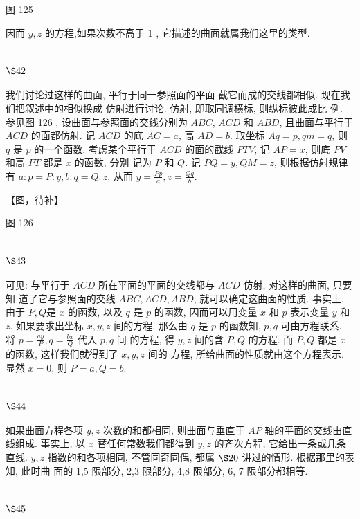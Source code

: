 图 125

因而 $y, z$ 的方程,如果次数不高于 1 , 它描述的曲面就属我们这里的类型.

\section{$\S 42$}

我们讨论过这样的曲面, 平行于同一参照面的平面 截它而成的交线都相似. 现在我们把叙述中的相似换成 仿射进行讨论. 仿射, 即取同调横标, 则纵标彼此成比 例. 参见图 126 , 设曲面与参照面的交线分别为 $A B C$, $A C D$ 和 $A B D$, 且曲面与平行于 $A C D$ 的面都仿射. 记 $A C D$ 的底 $A C=a$, 高 $A D=b$. 取坐标 $A q=p, q m=q$, 则 $q$ 是 $p$ 的一个函数. 考虑某个平行于 $A C D$ 的面的截线 $P T V$, 记 $A P=x$, 则底 $P V$ 和高 $P T$ 都是 $x$ 的函数, 分别 记为 $P$ 和 $Q$. 记 $P Q=y, Q M=z$, 则根据仿射规律有 $a :p=P: y, b: q=Q: z$, 从而 $y=\frac{P p}{a}, z=\frac{Q q}{b}$.

【图，待补】

图 126 

\section{$\S 43$}

可见: 与平行于 $A C D$ 所在平面的平面的交线都与 $A C D$ 仿射, 对这样的曲面, 只要知 道了它与参照面的交线 $A B C, A C D, A B D$, 就可以确定这曲面的性质. 事实上, 由于 $P, Q$是 $x$ 的函数, 以及 $q$ 是 $p$ 的函数, 因而可以用变量 $x$ 和 $p$ 表示变量 $y$ 和 $z$. 如果要求出坐标 $x, y, z$ 间的方程, 那么由 $q$ 是 $p$ 的函数知, $p, q$ 可由方程联系. 将 $p=\frac{a y}{P}, q=\frac{b x}{Q}$ 代入 $p, q$ 间 的方程, 得 $y, z$ 间的含 $P, Q$ 的方程. 而 $P, Q$ 都是 $x$ 的函数, 这样我们就得到了 $x, y, z$ 间的 方程, 所给曲面的性质就由这个方程表示. 显然 $x=0$, 则 $P=a, Q=b$.

\section{$\S 44$}

如果曲面方程各项 $y, z$ 次数的和都相同, 则曲面与垂直于 $A P$ 轴的平面的交线由直 线组成. 事实上, 以 $x$ 替任何常数我们都得到 $y, z$ 的齐次方程, 它给出一条或几条直线. $y, z$ 指数的和各项相同, 不管同奇同偶, 都属 $\S 20$ 讲过的情形. 根据那里的表知, 此时曲 面的 1,5 限部分, 2,3 限部分, 4,8 限部分, 6, 7 限部分都相等.

\section{$\S 45$}

